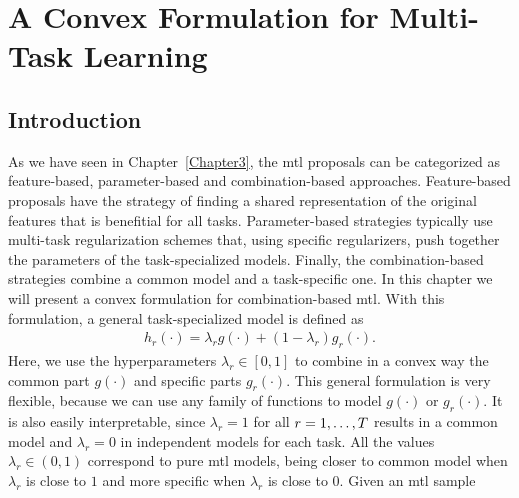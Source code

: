 
\chapter{A Convex Formulation for Multi-Task Learning} %
\label{Chapter4}

{\bf \small{

}}

\section{Introduction}
As we have seen in Chapter~\ref{Chapter3}, the \acrshort{mtl} proposals can be categorized as feature-based, parameter-based and combination-based approaches. Feature-based proposals have the strategy of finding a shared representation of the original features that is benefitial for all tasks. Parameter-based strategies typically use multi-task regularization schemes that, using specific regularizers, push together the parameters of the task-specialized models.
Finally, the combination-based strategies combine a common model and a task-specific one. 
%
In this chapter we will present a convex formulation for combination-based \acrshort{mtl}. With this formulation, a general task-specialized model is defined as
\begin{equation}
    \label{eq:convexmtl_general}
    \begin{aligned}
        h_r(\cdot)
       = \lambda_r g(\cdot) + (1 - \lambda_r) g_r(\cdot) .
    \end{aligned}    
\end{equation}
Here, we use the hyperparameters $\lambda_r \in [0, 1]$ to combine in a convex way the common part $g(\cdot)$ and specific parts $g_r(\cdot)$. This general formulation is very flexible, because we can use any family of functions to model $g(\cdot)$ or $g_r(\cdot)$. It is also easily interpretable, since $\lambda_r=1$ for all $r=1, \ldots, T$ results in a common model and $\lambda_r=0$ in independent models for each task. All the values $\lambda_r \in (0, 1)$ correspond to pure \acrshort{mtl} models, being closer to common model when $\lambda_r$ is close to $1$ and more specific when $\lambda_r$ is close to $0$.
%
Given an \acrshort{mtl} sample 

